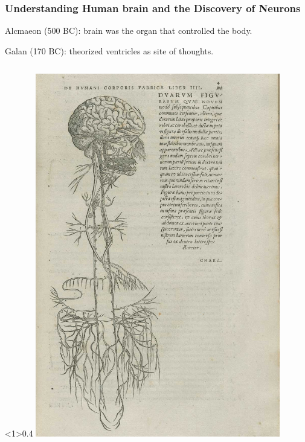 \documentclass{beamer}
\begin{document}
\begin{frame}
  \frametitle{Understanding Human brain and the Discovery of Neurons}
  Alcmaeon (500 BC): brain was the organ that controlled the body.

  Galan (170 BC): theorized ventricles as site of thoughts.

  \begin{columns}
    \begin{column}<1>{0.4\textwidth}
    \includegraphics[width=0.8\textwidth]{Vesalius_Nerves.jpg}


\end{column}
\end{columns}
\end{frame}
\end{document}
